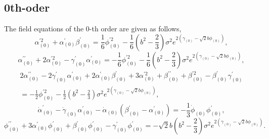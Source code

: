 \documentclass[a4paper,11pt]{article}
\begin{document}
\subsection{0th-oder}
The field equations of the 0-th order are given as follows, 
\begin{equation}
\alpha_{(0)}^{\prime 2}+\alpha_{(0)}^{\prime}\beta_{(0)}^{\prime}
=\frac{1}{6}\phi_{(0)}^{\prime 2}
-\frac{1}{6}\left(b^2-\frac{2}{3}\right)\sigma^2
 e^{2(\gamma_{(0)}-\sqrt{2}b\phi_{(0)})}, 
\end{equation}
\begin{equation}
\alpha_{(0)}^{\prime\prime}+2\alpha_{(0)}^{\prime 2}
-\gamma_{(0)}^{\prime}\alpha_{(0)}^{\prime}
=-\frac{1}{6}\phi_{(0)}^{\prime 2}
-\frac{1}{6}\left(b^2-\frac{2}{3}\right)\sigma^2
e^{2(\gamma_{(0)}-\sqrt{2}b\phi_{(0)})}, 
\end{equation}
\begin{multline}
2\alpha_{(0)}^{\prime\prime}-2\gamma_{(0)}^{\prime}\alpha_{(0)}^{\prime}
+2\alpha_{(0)}^{\prime}\beta_{(0)}^{\prime}+3\alpha_{(0)}^{\prime 2}
+\beta_{(0)}^{\prime\prime}+\beta_{(0)}^{\prime 2}
-\beta_{(0)}^{\prime}\gamma_{(0)}^{\prime} \\
=-\frac{1}{2}\phi_{(0)}^{\prime 2}
-\frac{1}{2}\left(b^2-\frac{2}{3}\right)\sigma^2
e^{2(\gamma_{(0)}-\sqrt{2}b\phi_{(0)})},
\end{multline}
\begin{equation}
\dot{\alpha}_{(0)}^{\prime}-\dot{\gamma}_{(0)}\alpha_{(0)}^{\prime}
-\dot{\alpha}_{(0)}(\beta_{(0)}^{\prime}-\alpha_{(0)}^{\prime})
=-\frac{1}{3}\dot{\phi}_{(0)}\phi_{(0)}^{\prime},
\end{equation}
\begin{equation}
\phi_{(0)}^{\prime\prime}+3\alpha_{(0)}^{\prime}\phi_{(0)}^{\prime}
+\beta_{(0)}^{\prime}\phi_{(0)}^{\prime}
-\gamma_{(0)}^{\prime}\phi_{(0)}^{\prime}
=-\sqrt{2}b\left(b^2-\frac{2}{3}\right)\sigma^2
e^{2(\gamma_{(0)}-\sqrt{2}b\phi_{(0)})}.
\end{equation}
\end{document}
